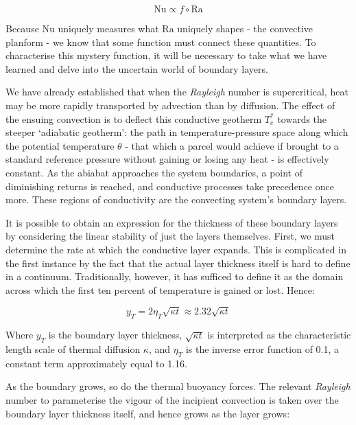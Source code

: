 \documentclass[a4paper,11pt,oneside]{book}
\begin{document}
\begin{equation}
\mathrm{Nu} \propto f \circ \mathrm{Ra}
\end{equation}

Because $\mathrm{Nu}$ uniquely measures what $\mathrm{Ra}$ uniquely shapes - the convective planform - we know that some function must connect these quantities. To characterise this mystery function, it will be necessary to take what we have learned and delve into the uncertain world of boundary layers.

We have already established that when the \textit{Rayleigh} number is supercritical, heat may be more rapidly transported by advection than by diffusion. The effect of the ensuing convection is to deflect this conductive geotherm $T_c^*$ towards the steeper `adiabatic geotherm': the path in temperature-pressure space along which the potential temperature $\theta$ - that which a parcel would achieve if brought to a standard reference pressure without gaining or losing any heat - is effectively constant. As the abiabat approaches the system boundaries, a point of diminishing returns is reached, and conductive processes take precedence once more. These regions of conductivity are the convecting system's boundary layers.

It is possible to obtain an expression for the thickness of these boundary layers by considering the linear stability of just the layers themselves. First, we must determine the rate at which the conductive layer expands. This is complicated in the first instance by the fact that the actual layer thickness itself is hard to define in a continuum. Traditionally, however, it has sufficed to define it as the domain across which the first ten percent of temperature is gained or lost. Hence:

\begin{equation}
y_T = 2 \eta_T \sqrt{\kappa t} \approx 2.32 \sqrt{\kappa t}
\end{equation}

Where $y_T$ is the boundary layer thickness, $\sqrt{\kappa t}$ is interpreted as the characteristic length scale of thermal diffusion $\kappa$, and $\eta_T$ is the inverse error function of 0.1, a constant term approximately equal to 1.16.

As the boundary grows, so do the thermal buoyancy forces. The relevant \textit{Rayleigh} number to parameterise the vigour of the incipient convection is taken over the boundary layer thickness itself, and hence grows as the layer grows:
\end{document}
